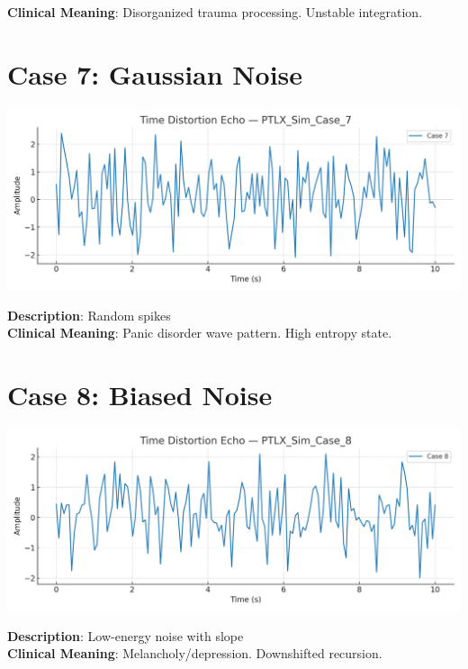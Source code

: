 \documentclass[12pt]{article}
\begin{document}
\textbf{Clinical Meaning}: Disorganized trauma processing. Unstable integration.

\newpage

\section*{Case 7: Gaussian Noise}
\begin{center}
\includegraphics[width=0.95\linewidth]{PTLX_Sim_Case_7.png}
\end{center}
\textbf{Description}: Random spikes \\

\textbf{Clinical Meaning}: Panic disorder wave pattern. High entropy state.

\newpage

\section*{Case 8: Biased Noise}
\begin{center}
\includegraphics[width=0.95\linewidth]{PTLX_Sim_Case_8.png}
\end{center}
\textbf{Description}: Low-energy noise with slope \\

\textbf{Clinical Meaning}: Melancholy/depression. Downshifted recursion.

\newpage
\end{document}
